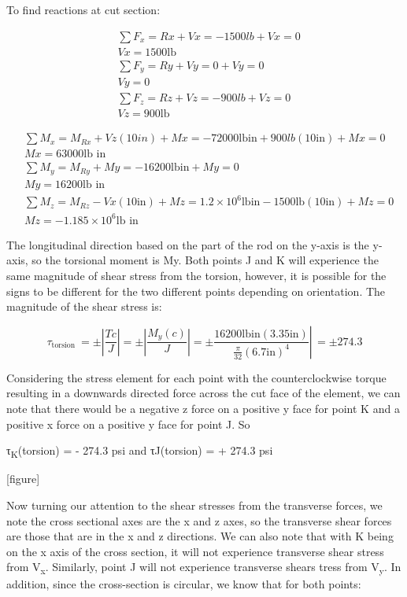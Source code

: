\documentclass[
  letterpaper,
  DIV=11,
  numbers=noendperiod]{scrreprt}
\begin{document}
\begin{tcolorbox}
\begin{tcolorbox}
To find reactions at cut section:

\[
\begin{aligned}
& \sum F_x=R x+V x=-1500 l b+V x=0 \\
& V x=1500 \mathrm{lb} \\
& \sum F_y=R y+V y=0+V y=0 \\
& V y=0 \\
& \sum F_z=R z+V z=-900 l b+V z=0 \\
& V z=900 \mathrm{lb}
\end{aligned}
\]

\[
\begin{aligned}
& \sum M_x=M_{R x}+V z(10 i n)+M x=-72000 \mathrm{lbin}+900 l b(10 \mathrm{in})+M x=0 \\
& M x=63000 \mathrm{lb} \text { in } \\
& \sum M_y=M_{R y}+M y=-16200 \mathrm{lbin}+M y=0 \\
& M y=16200 \mathrm{lb} \text { in } \\
& \sum M_z=M_{R z}-V x(10 \mathrm{in})+M z=1.2 \times 10^6 \mathrm{lb} \mathrm{in}-1500 \mathrm{lb}(10 \mathrm{in})+M z=0 \\
& M z=-1.185 \times 10^6 \mathrm{lb} \text { in }
\end{aligned}
\]

The longitudinal direction based on the part of the rod on the y-axis is
the y-axis, so the torsional moment is My. Both points J and K will
experience the same magnitude of shear stress from the torsion, however,
it is possible for the signs to be different for the two different
points depending on orientation. The magnitude of the shear stress is:

\[
\left.\tau_{\text {torsion }}= \pm\left|\frac{T c}{J}\right|= \pm\left|\frac{M_y(c)}{J}\right|= \pm \frac{16200 \mathrm{lb} \mathrm{in} \mathrm{(3.35in)}}{\frac{\pi}{32}(6.7 \mathrm{in})^4} \right\rvert\,= \pm 274.3
\]

Considering the stress element for each point with the counterclockwise
torque resulting in a downwards directed force across the cut face of
the element, we can note that there would be a negative z force on a
positive y face for point K and a positive x force on a positive y face
for point J. So

τ\textsubscript{K}(torsion) = - 274.3 psi and τJ(torsion) = + 274.3 psi

{[}figure{]}

Now turning our attention to the shear stresses from the transverse
forces, we note the cross sectional axes are the x and z axes, so the
transverse shear forces are those that are in the x and z directions. We
can also note that with K being on the x axis of the cross section, it
will not experience transverse shear stress from V\textsubscript{x}.
Similarly, point J will not experience transverse shears tress from
V\textsubscript{y}. In addition, since the cross-section is circular, we
know that for both points:


\end{tcolorbox}
\end{tcolorbox}
\end{document}
